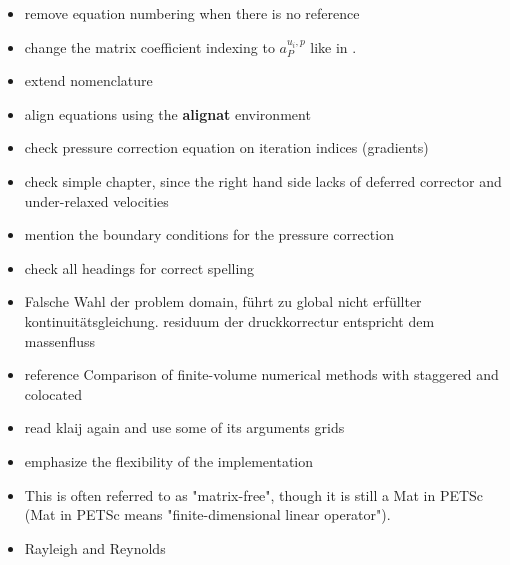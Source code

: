 \documentclass[article,type=msc,colorback,accentcolor=tud2a]{tudreport}
\begin{document}
  \begin{itemize}
    \item remove equation numbering when there is no reference
    \item change the matrix coefficient indexing to \(a_P^{u_i,p}\) like in \cite{darwish09}.
    \item extend nomenclature
    \item align equations using the \textbf{alignat} environment
    \item check pressure correction equation on iteration indices (gradients)
    \item check simple chapter, since the right hand side lacks of deferred corrector and under-relaxed velocities
    \item mention the boundary conditions for the pressure correction
    \item check all headings for correct spelling
    \item Falsche Wahl der problem domain, führt zu global nicht erfüllter kontinuitätsgleichung. residuum der druckkorrectur entspricht dem massenfluss
    \item reference Comparison of finite-volume numerical methods with staggered and colocated
    \item read klaij again and use some of its arguments
      grids
    \item emphasize the flexibility of the implementation
    \item This is often referred to as "matrix-free", though it is still a Mat in PETSc (Mat in PETSc means "finite-dimensional linear operator").  
    \item Rayleigh and Reynolds
  \end{itemize}

  
  
  
  
  
  
  
  
  

    \nocite{*}

\clearpage
{}

\end{document}
